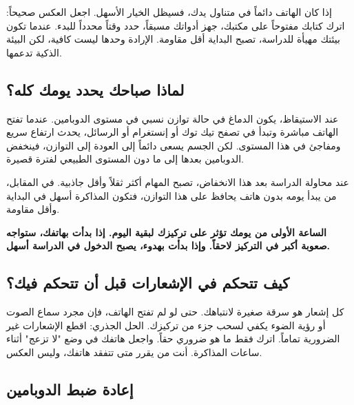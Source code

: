 \documentclass[12pt,a4paper]{book}
\newcommand{\importantAr}[1]{%
	\begin{important}
		\bfseries #1
	\end{important}
}
\begin{document}
إذا كان الهاتف دائماً في متناول يدك، فسيظل الخيار الأسهل. اجعل العكس صحيحاً: اترك كتابك مفتوحاً على مكتبك، جهز أدواتك مسبقاً، حدد وقتاً محدداً للبدء. عندما تكون بيئتك مهيأة للدراسة، تصبح البداية أقل مقاومة. الإرادة وحدها ليست كافية، لكن البيئة الذكية تدعمها.

\subsection{لماذا صباحك يحدد يومك كله؟}

عند الاستيقاظ، يكون الدماغ في حالة توازن نسبي في مستوى الدوبامين. عندما تفتح الهاتف مباشرة وتبدأ في تصفح تيك توك أو إنستغرام أو الرسائل، يحدث ارتفاع سريع ومفاجئ في هذا المستوى. لكن الجسم يسعى دائماً إلى العودة إلى التوازن، فينخفض الدوبامين بعدها إلى ما دون المستوى الطبيعي لفترة قصيرة.

عند محاولة الدراسة بعد هذا الانخفاض، تصبح المهام أكثر ثقلاً وأقل جاذبية. في المقابل، من يبدأ يومه بدون هاتف يحافظ على هذا التوازن، فتكون المذاكرة أسهل في البداية وأقل مقاومة.

\importantAr{الساعة الأولى من يومك تؤثر على تركيزك لبقية اليوم. إذا بدأت بهاتفك، ستواجه صعوبة أكبر في التركيز لاحقاً. وإذا بدأت بهدوء، يصبح الدخول في الدراسة أسهل.}

\subsection{كيف تتحكم في الإشعارات قبل أن تتحكم فيك؟}

كل إشعار هو سرقة صغيرة لانتباهك. حتى لو لم تفتح الهاتف، فإن مجرد سماع الصوت أو رؤية الضوء يكفي لسحب جزء من تركيزك. الحل الجذري: اقطع الإشعارات غير الضرورية تماماً. اترك فقط ما هو ضروري حقاً. واجعل هاتفك في وضع "لا تزعج" أثناء ساعات المذاكرة. أنت من يقرر متى تتفقد هاتفك، وليس العكس.

\subsection{إعادة ضبط الدوبامين}
\end{document}
